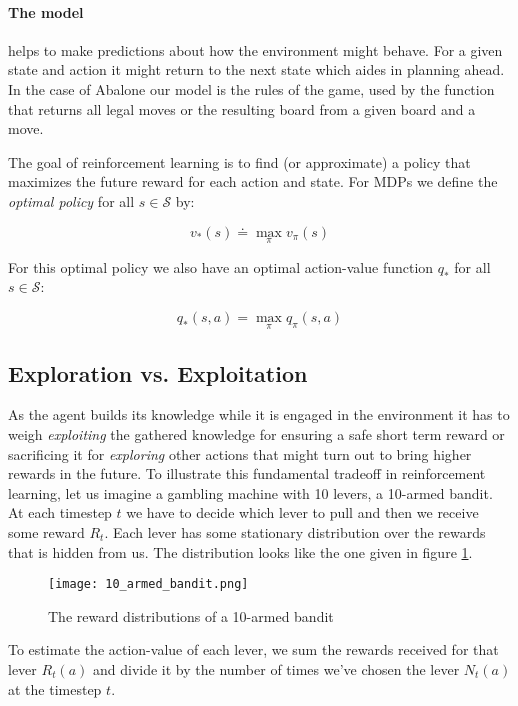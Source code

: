 \paragraph{The model} helps to make predictions about how the environment might behave. For a given state and action it might return to the next state which aides in planning ahead. In the case of Abalone our model is the rules of the game, used by the function that returns all legal moves or the resulting board from a given board and a move.

The goal of reinforcement learning is to find (or approximate) a policy that maximizes the future reward for each action and state. For MDPs we define the \textit{optimal policy} for all $ s \in \mathcal{S} $ by:

$$ v_{*}(s) \doteq \max_{\pi} v_{\pi}(s) $$

For this optimal policy we also have an optimal action-value function $ q_{*} $ for all $ s \in \mathcal{S}$:

$$ q_{*}(s, a) = \max_{\pi}q_{\pi}(s, a) $$

\subsection{Exploration vs. Exploitation}
\label{exploration_vs_exploitation}
As the agent builds its knowledge while it is engaged in the environment it has to weigh \textit{exploiting} the gathered knowledge for ensuring a safe short term reward or sacrificing it for \textit{exploring} other actions that might turn out to bring higher rewards in the future. To illustrate this fundamental tradeoff in reinforcement learning, let us imagine a gambling machine with 10 levers, a 10-armed bandit. At each timestep $ t $ we have to decide which lever to pull and then we receive some reward $ R_t $. Each lever has some stationary distribution over the rewards that is hidden from us. The distribution looks like the one given in figure \ref{10_armed_bandit}.

\begin{figure}
    \centering
    \texttt{[image: 10\_armed\_bandit.png]}
    \caption{The reward distributions of a 10-armed bandit \cite[p.28]{sutton_reinforcement_2018}}
    \label{10_armed_bandit}
\end{figure}

To estimate the action-value of each lever, we sum the rewards received for that lever $ R_t(a) $ and divide it by the number of times we've chosen the lever $ N_t(a) $ at the timestep $ t $.

